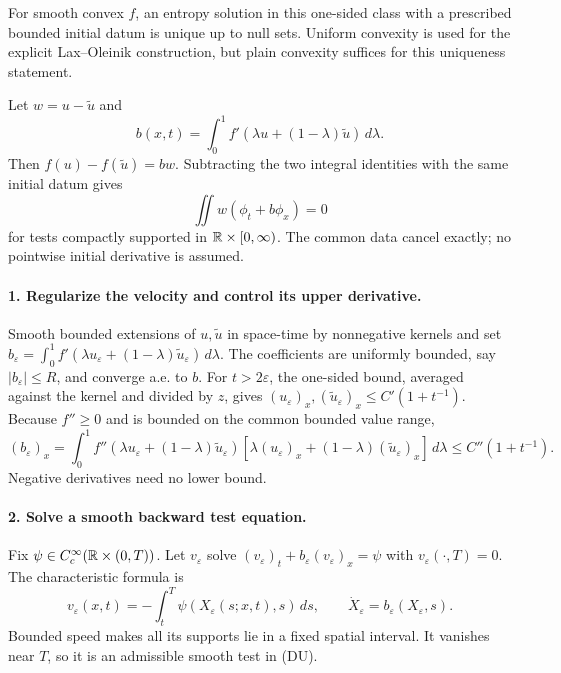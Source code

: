 \begin{theorem}
For smooth convex $f$, an entropy solution in this one-sided class
with a prescribed bounded initial datum is unique up to null sets.
Uniform convexity is used for the explicit Lax--Oleinik construction,
but plain convexity suffices for this uniqueness statement.
\end{theorem}
\begin{expandedproof}
Let $w=u-\widetilde u$ and
\[
 b(x,t)=\int_0^1f'(\lambda u+(1-\lambda)\widetilde u)\,d\lambda .
\]
Then $f(u)-f(\widetilde u)=bw$. Subtracting the two integral identities
with the same initial datum gives
\[
 \iint w(\phi_t+b\phi_x)=0
 \tag{DU}
\]
for tests compactly supported in $\mathbb{R}\times[0,\infty)$.
The common data cancel exactly; no pointwise initial derivative is assumed.

\paragraph{1. Regularize the velocity and control its upper derivative.}
Smooth bounded extensions of $u,\widetilde u$ in space-time by
nonnegative kernels and set
$b_\varepsilon=\int_0^1f'(\lambda u_\varepsilon+
(1-\lambda)\widetilde u_\varepsilon)\,d\lambda$.
The coefficients are uniformly bounded, say $|b_\varepsilon|\leq R$,
and converge a.e. to $b$.
For $t>2\varepsilon$, the one-sided bound, averaged against the kernel
and divided by $z$, gives
$(u_\varepsilon)_x,(\widetilde u_\varepsilon)_x
 \leq C'(1+t^{-1})$.
Because $f''\geq0$ and is bounded on the common bounded value range,
\[
 (b_\varepsilon)_x
 =\int_0^1 f''(\lambda u_\varepsilon+(1-\lambda)\widetilde u_\varepsilon)
       [\lambda(u_\varepsilon)_x+
                    (1-\lambda)(\widetilde u_\varepsilon)_x]\,d\lambda
 \leq C''(1+t^{-1}).
\]
Negative derivatives need no lower bound.

\paragraph{2. Solve a smooth backward test equation.}
Fix $\psi\in C_c^\infty(\mathbb{R}\times(0,T))$.
Let $v_\varepsilon$ solve
$(v_\varepsilon)_t+b_\varepsilon(v_\varepsilon)_x=\psi$ with
$v_\varepsilon(\cdot,T)=0$.
The characteristic formula is
\[
 v_\varepsilon(x,t)
 =-\int_t^T\psi(X_\varepsilon(s;x,t),s)\,ds,\qquad
 \dot X_\varepsilon=b_\varepsilon(X_\varepsilon,s).
\]
Bounded speed makes all its supports lie in a fixed spatial interval.
It vanishes near $T$, so it is an admissible smooth test in (DU).


\end{expandedproof}

